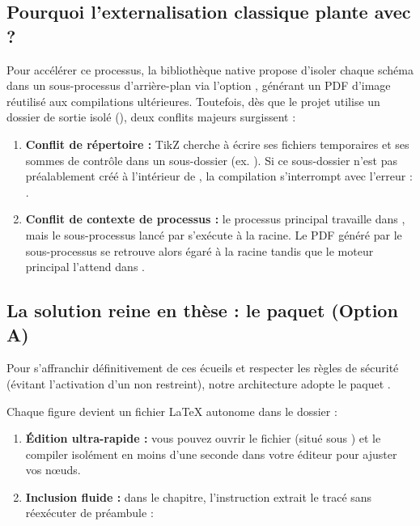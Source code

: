 \subsection[Limites de l'externalisation TikZ avec un dossier \code{build/}]{Pourquoi l'externalisation classique plante avec  ?}
Pour accélérer ce processus, la bibliothèque native  propose
d'isoler chaque schéma dans un sous-processus d'arrière-plan via l'option ,
générant un PDF d'image réutilisé aux compilations ultérieures.
Toutefois, dès que le projet utilise un dossier de sortie isolé (),
deux conflits majeurs surgissent :
\begin{enumerate}
  \item \textbf{Conflit de répertoire :} TikZ cherche à écrire ses fichiers temporaires et ses sommes de contrôle
  dans un sous-dossier (ex. ). Si ce sous-dossier n'est pas préalablement créé
  à l'intérieur de , la compilation s'interrompt avec l'erreur :
  .
  \item \textbf{Conflit de contexte de processus :} le processus principal travaille dans ,
  mais le sous-processus lancé par  s'exécute à la racine.
  Le PDF généré par le sous-processus se retrouve alors égaré à la racine tandis que le moteur principal l'attend dans .
\end{enumerate}

\subsection{La solution reine en thèse : le paquet  (Option A)}
Pour s'affranchir définitivement de ces écueils et respecter les règles de sécurité
(évitant l'activation d'un  non restreint),
notre architecture adopte le paquet .

Chaque figure devient un fichier \LaTeX{} autonome dans le dossier  :
\begin{enumerate}
  \item \textbf{Édition ultra-rapide :} vous pouvez ouvrir le fichier  (situé sous )
  et le compiler isolément en moins d'une seconde dans votre éditeur pour ajuster vos n\oe{}uds.
  \item \textbf{Inclusion fluide :} dans le chapitre,
  l'instruction  extrait le tracé sans réexécuter de préambule :
\end{enumerate}

